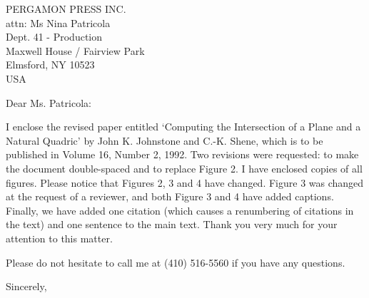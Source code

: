 \signature{John K. Johnstone\\jj@cs.jhu.edu}

\begin{letter}
{PERGAMON PRESS INC.\\
attn: Ms Nina Patricola\\
Dept. 41 - Production\\
Maxwell House / Fairview Park\\
Elmsford, NY  10523\\
USA
}

\noindent \opening{Dear Ms. Patricola:}

I enclose the revised paper entitled
`Computing the Intersection of a Plane and a Natural Quadric' by
John K. Johnstone and C.-K. Shene, which is to be published in 
Volume 16, Number 2, 1992.
Two revisions were requested: to make the document double-spaced 
and to replace Figure 2.
I have enclosed copies of all figures.
Please notice that Figures 2, 3 and 4 have changed.
Figure 3 was changed at the request of a reviewer, and 
both Figure 3 and 4 have added captions.
Finally, we have added one citation (which causes a renumbering of citations
in the text) and one sentence to the main text.
Thank you very much for your attention to this matter.

Please do not hesitate to call me at (410) 516-5560 if you have any questions.

\closing{Sincerely,}
\end{letter}


